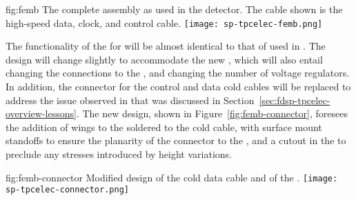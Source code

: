 \begin{dunefigure}
{fig:femb}
{The complete  assembly as used in the  
detector. The cable shown is the high-speed data, clock, and control cable.}
\texttt{[image: sp-tpcelec-femb.png]}
\end{dunefigure}

The functionality of the  for  will be
almost identical to that of  used in .
The design will change slightly to accommodate the new ,
which will also entail changing the connections to the ,
and changing the number of voltage regulators. In addition, the
connector for the control and data cold cables will be replaced
to address the issue observed in  that was discussed
in Section~\ref{sec:fdsp-tpcelec-overview-lessons}. The new design,
shown in Figure~\ref{fig:femb-connector}, foresees the addition
of wings to the  soldered to the cold cable, with 
surface mount standoffs to ensure the planarity of the connector
to the , and a cutout in the  to preclude %
any stresses introduced by height variations.

\begin{dunefigure}
{fig:femb-connector}
{Modified design of the cold data cable and of the  .}
\texttt{[image: sp-tpcelec-connector.png]}
\end{dunefigure}

